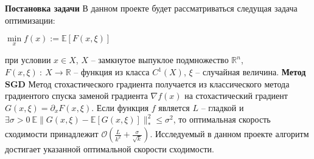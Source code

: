 \documentclass[oneside,final,12pt]{article}
\begin{document}
\noindent\textbf{\Large{Постановка задачи}}\newline\break
В данном проекте будет рассматриваться следущая задача оптимизации:\newline
\centerline{$\min\limits_{x} f(x) := \mathbb{E}[F(x, \xi)]$}\newline
при условии $x\in X$, $X$ -- замкнутое выпуклое подмножество $\mathbb{R}^n$, $F(x, \xi)\ :\ X \to \mathbb{R}$ -- функция из класса $C^1(X)$, $\xi$ -- случайная величина.\newline
\break\noindent\textbf{\Large{Метод SGD}}\newline\break
Метод стохастического градиента получается из классического метода градиентого спуска заменой градиента $\nabla f(x)$ на стохастический
градиент $G(x, \xi) = \partial_x F(x, \xi)$. Если функция $f$ является $L$ -- гладкой и $\exists\sigma > 0\ \mathbb{E}\|G(x, \xi) - \mathbb{E}[G(x, \xi)]\|^2_{*} \le \sigma^2$, то оптимальная скорость сходимости принадлежит $\mathcal{O}(\frac{L}{k^2} + \frac{\sigma}{\sqrt{k}})$. Исследуемый в данном проекте алгоритм достигает указанной оптимальной скорости сходимости.
\end{document}
